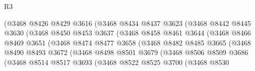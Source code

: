 \begin{lexlean}{R3}
\begin{coremodule}
                            (@3468
                              @8426
                              @8429
                              @3616
                              (@3468
                                @8434
                                @8437
                                @3623
                                (@3468
                                  @8442
                                  @8445
                                  @3630
                                  (@3468
                                    @8450
                                    @8453
                                    @3637
                                    (@3468
                                      @8458
                                      @8461
                                      @3644
                                      (@3468
                                        @8466
                                        @8469
                                        @3651
                                        (@3468
                                          @8474
                                          @8477
                                          @3658
                                          (@3468
                                            @8482
                                            @8485
                                            @3665
                                            (@3468
                                              @8490
                                              @8493
                                              @3672
                                              (@3468
                                                @8498
                                                @8501
                                                @3679
                                                (@3468
                                                  @8506
                                                  @8509
                                                  @3686
                                                  (@3468
                                                    @8514
                                                    @8517
                                                    @3693
                                                    (@3468
                                                      @8522
                                                      @8525
                                                      @3700
                                                      (@3468
                                                        @8530

\end{coremodule}
\end{lexlean}
